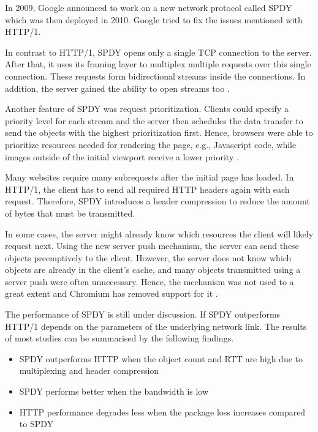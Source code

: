 \documentclass[conference]{IEEEtran}
\begin{document}
In 2009, Google announced to work on a new network protocol called SPDY which was then deployed in 2010. Google tried to fix the issues mentioned with HTTP/1.

In contrast to HTTP/1, SPDY opens only a single TCP connection to the server. After that, it uses its framing layer to multiplex multiple requests over this single connection. These requests form bidirectional streams inside the connections. In addition, the server gained the ability to open streams too \cite{HowQuickIsQuic}.

Another feature of SPDY was request prioritization. Clients could specify a priority level for each stream and the server then schedules the data transfer to send the objects with the highest prioritization first. Hence, browsers were able to prioritize resources needed for rendering the page, e.g., Javascript code, while images outside of the initial viewport receive a lower priority \cite{HowQuickIsQuic}.

Many websites require many subrequests after the initial page has loaded. In HTTP/1, the client has to send all required HTTP headers again with each request. Therefore, SPDY introduces a header compression to reduce the amount of bytes that must be transmitted.

In some cases, the server might already know which resources the client will likely request next. Using the new server push mechanism, the server can send these objects preemptively to the client. However, the server does not know which objects are already in the client's cache, and many objects transmitted using a server push were often unnecessary. Hence, the mechanism was not used to a great extent and Chromium has removed support for it \cite{RemoveServerPush}.


The performance of SPDY is still under discussion. If SPDY outperforms HTTP/1 depends on the parameters of the underlying network link. The results of most studies can be summarised by the following findings.

\begin{itemize}
  \item SPDY outperforms HTTP when the object count and RTT are high due to multiplexing and header compression
  \item SPDY performs better when the bandwidth is low
  \item HTTP performance degrades less when the package loss increases compared to SPDY
\end{itemize}
\end{document}
